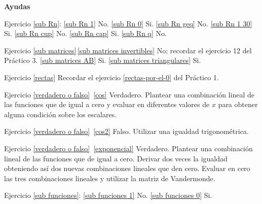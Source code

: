 \begin{enumerate}[resume, topsep=6pt, itemsep=.4cm]
\begin{enumerate}
    \end{enumerate}


\end{enumerate}

%
%
%
%
%
%         
%

\textbf{Ayudas}

Ejercicio \ref{sub Rn}: 
\ref{sub Rn 1} No. \ref{sub Rn 0} Si. \ref{sub Rn geq} No. \ref{sub Rn 1 30} Si. \ref{sub Rn cup} No. \ref{sub Rn cap} Si. \ref{sub Rn q} No.


Ejercicio \ref{sub matrices}\,\ref{sub matrices invertibles} No; recordar el ejercicio 12 del Práctico 3. \ref{sub matrices AB} Si. \ref{sub matrices triangulares} Si.

Ejercicio \ref{rectas} Recordar el ejercicio \ref{rectas-por-el-0} del Práctico 1.

Ejercicio \ref{verdadero o falso}\, \ref{cos} Verdadero. Plantear una combinación lineal de las funciones que de igual a cero y evaluar en diferentes valores de $x$ para obtener alguna condición sobre los escalares.

Ejercicio \ref{verdadero o falso}\, \ref{cos2} Falso. Utilizar una igualdad trigonométrica.

Ejercicio \ref{verdadero o falso}\, \ref{exponencial} Verdadero. Plantear una combinación lineal de las funciones que de igual a cero. Derivar dos veces la igualdad obteniendo así dos nuevas combinaciones lineales que den cero. Evaluar en cero las tres combinaciones lineales y utilizar la matriz de Vandermonde.

Ejercicio \ref{sub funciones}: \ref{sub funciones 1} No. \ref{sub funciones 0} Si.

